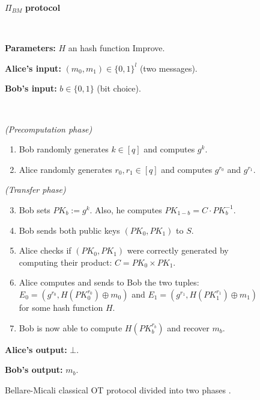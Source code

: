 \begin{figure}[h!]
\centering
\begin{tcolorbox}
                        
    \centerline{$\Pi_{BM}$ \textbf{protocol}}
            
    \
    
    \textbf{Parameters:} $H$ an hash function {\cv Improve}.
    
    \textbf{Alice's input:} $(m_0, m_1)\in\{0,1\}^l$ (two messages). 
    
    \textbf{Bob's input:} $b\in\{0,1\}$ (bit choice).
    
    \
    
    \textit{(Precomputation phase)}
    \begin{enumerate}
         \item Bob randomly generates $k\in [q]$ and computes $g^k$.
         \item Alice randomly generates $r_0, r_1\in [q]$ and computes $g^{r_0}$ and $g^{r_1}$.
    \end{enumerate}
    \textit{(Transfer phase)}
    \begin{enumerate}
    \setcounter{enumi}{2}
        \item Bob sets $PK_b := g^k$. Also, he computes $PK_{1-b} = C \cdot PK_b^{-1}$.
        \item Bob sends both public keys $(PK_0, PK_1)$ to $S$.
        \item Alice checks if $(PK_0, PK_1)$ were correctly generated by computing their product: $C = PK_0 \times PK_1$.
        \item Alice computes and sends to Bob the two tuples: $E_0 = ( g^{r_0}, H(PK_0^{r_0})\oplus m_0 )$ and $E_1 = ( g^{r_1}, H(PK_1^{r_1})\oplus m_1 )$ for some hash function $H$.
        \item Bob is now able to compute $H(PK_b^{r_b})$ and recover $m_b$.
    \end{enumerate} 
    
    \textbf{Alice's output:} $\bot$.
    
    \textbf{Bob's output:} $m_b$.
    
\end{tcolorbox} 
	\caption{Bellare-Micali classical OT protocol divided into two phases \cite{BM89}.}
	\label{fig:BMOTProtocol}
\end{figure}



%
%
%
